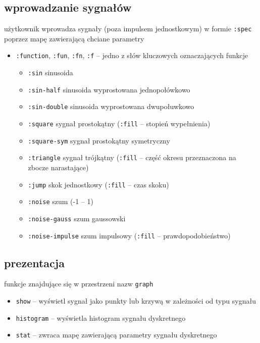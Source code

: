 \documentclass[12pt]{article}
\newcommand{\cljt}[1]{\texttt{#1}}
\begin{document}
\subsection{wprowadzanie sygnałów}
użytkownik wprowadza sygnały (poza impulsem jednostkowym) w formie \cljt{:spec} poprzez mapę zawierającą
chciane parametry
\begin{itemize}
	\item \cljt{:function}, \cljt{:fun}, \cljt{:fn}, \cljt{:f} -- jedno z słów kluczowych oznaczających funkcje
	      \begin{itemize}
		      \item \cljt{:sin} sinusoida
		      \item \cljt{:sin-half} sinusoida wyprostowana jednopołówkowo
		      \item \cljt{:sin-double} sinusoida wyprostowana dwupołuwkowo
		      \item \cljt{:square} sygnał prostokątny (\cljt{:fill} -- stopień wypełnienia)
		      \item \cljt{:square-sym} sygnał prostokątny symetryczny
		      \item \cljt{:triangle} sygnał trójkątny (\cljt{:fill} -- część okresu przeznaczona na zbocze narastające)
		      \item \cljt{:jump} skok jednostkowy (\cljt{:fill} -- czas skoku)
		      \item \cljt{:noise} szum (-1 -- 1)
		      \item \cljt{:noise-gauss} szum gaussowski
		      \item \cljt{:noise-impulse} szum impulsowy (\cljt{:fill} -- prawdopodobieństwo)

	      \end{itemize}
\end{itemize}

\subsection{prezentacja}
funkcje znajdujące się w przestrzeni nazw \cljt{graph}
\begin{itemize}
	\item \cljt{show} -- wyświetl sygnał jako punkty lub krzywą w zależności od typu sygnału
	\item \cljt{histogram} -- wyświetla histogram sygnału dyskretnego
	\item \cljt{stat} -- zwraca mapę zawierającą parametry sygnału dyskretnego
\end{itemize}
\end{document}
